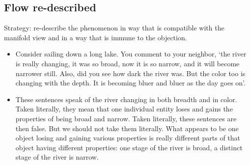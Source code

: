 \documentclass[oneside]{article}
\begin{document}
\subsection*{Flow re-described}

\noindent Strategy: re-describe the phenomenon in way that is compatible with the manifold view and in a way that is immune to the objection. 

\begin{itemize}
\item Consider sailing down a long lake. You comment to your neighbor, `the river is really changing, it was so broad, now it is so narrow, and it will become narrower still. Also, did you see how dark the river was. But the color too is changing with the depth. It is becoming bluer and bluer as the day goes on'. 
\item These sentences speak of the river changing in both breadth and in color. Taken literally, they mean that one individual entity loses and gains the properties of being broad and narrow. Taken literally, these sentences are then false. But we should not take them literally. What appears to be one object losing and gaining various properties is really different parts of that object having different properties: one stage of the river is broad, a distinct stage of the river is narrow. 
\end{itemize}
\end{document}
